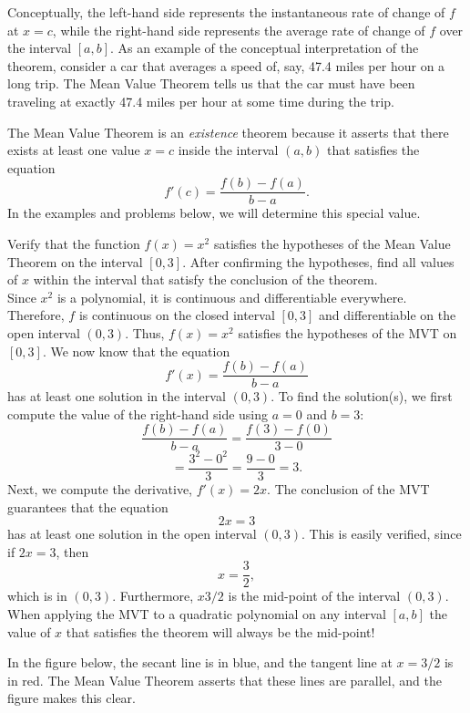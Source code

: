 \documentclass[handout]{ximera}
\begin{document}
Conceptually, the left-hand side represents the instantaneous rate of change of $f$ at $x = c$, while the
right-hand side represents the average rate of change of $f$ over the interval $[a,b]$. 
As an example of the conceptual interpretation of the theorem, consider a car that averages a speed of, say, 47.4 miles per hour on a long trip. 
The Mean Value Theorem tells us that the car must have been 
traveling at exactly 47.4 miles per hour at some time during the trip.

The Mean Value Theorem is an {\it existence} theorem because it asserts that there exists at least one value $x=c$ inside the interval $(a,b)$
that satisfies the equation 
\[f'(c) = \frac{f(b) - f(a)}{b-a}.\]
In the examples and problems below, we will determine this special value. 

\begin{example}[example 3]
Verify that the function $f(x) = x^2$ satisfies the hypotheses of the Mean Value Theorem
on the interval $[0,3]$. 
After confirming the hypotheses, find all values of $x$ within the interval that satisfy the conclusion of the theorem.\\
Since $x^2$ is a polynomial, it is continuous and differentiable everywhere. Therefore, $f$ is continuous on the closed interval $[0, 3]$ and differentiable on the open interval $(0, 3)$. 
Thus, $f(x) = x^2$ satisfies the hypotheses of the MVT on $[0, 3]$. We now know that the equation
\[
f'(x) = \frac{f(b) - f(a)}{b-a}
\]
has at least one solution in the interval $(0, 3)$. To find the solution(s), 
we first compute the value of the right-hand side using $a = 0$ and $b = 3$:
\[\frac{f(b) - f(a)}{b-a} = \frac{f(3) - f(0)}{3-0} \]
\[= \frac{3^2 - 0^2}{3}= \frac{9 - 0}{3} = 3.\]
Next, we compute the derivative, $f'(x) = 2x$.
The conclusion of the MVT guarantees that the equation
\[2x = 3\]
has at least one solution in the open interval $(0,3)$.
This is easily verified, since if $2x = 3$, then 
\[x = \frac{3}{2},
\]
which is in $(0, 3)$.
Furthermore, $x 3/2$ is the mid-point of the interval $(0, 3)$.
When applying the MVT to a quadratic polynomial on any interval $[a, b]$ the value of $x$ that satisfies the theorem will always be the mid-point!

In the figure below, the secant line is in blue, 
and the tangent line at $x = 3/2$ is in red. The Mean Value Theorem asserts that these lines are parallel, and the figure makes this clear.


\end{example}
\end{document}
